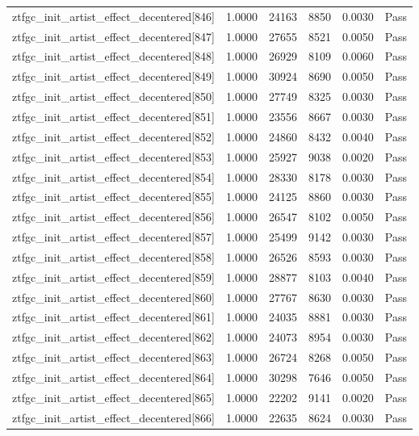 \begin{table}[htbp]
\begin{tabular}{llrrll}
ztfgc\_init\_artist\_effect\_decentered[846] & 1.0000 & 24163 & 8850 & 0.0030 & Pass \\
ztfgc\_init\_artist\_effect\_decentered[847] & 1.0000 & 27655 & 8521 & 0.0050 & Pass \\
ztfgc\_init\_artist\_effect\_decentered[848] & 1.0000 & 26929 & 8109 & 0.0060 & Pass \\
ztfgc\_init\_artist\_effect\_decentered[849] & 1.0000 & 30924 & 8690 & 0.0050 & Pass \\
ztfgc\_init\_artist\_effect\_decentered[850] & 1.0000 & 27749 & 8325 & 0.0030 & Pass \\
ztfgc\_init\_artist\_effect\_decentered[851] & 1.0000 & 23556 & 8667 & 0.0030 & Pass \\
ztfgc\_init\_artist\_effect\_decentered[852] & 1.0000 & 24860 & 8432 & 0.0040 & Pass \\
ztfgc\_init\_artist\_effect\_decentered[853] & 1.0000 & 25927 & 9038 & 0.0020 & Pass \\
ztfgc\_init\_artist\_effect\_decentered[854] & 1.0000 & 28330 & 8178 & 0.0030 & Pass \\
ztfgc\_init\_artist\_effect\_decentered[855] & 1.0000 & 24125 & 8860 & 0.0030 & Pass \\
ztfgc\_init\_artist\_effect\_decentered[856] & 1.0000 & 26547 & 8102 & 0.0050 & Pass \\
ztfgc\_init\_artist\_effect\_decentered[857] & 1.0000 & 25499 & 9142 & 0.0030 & Pass \\
ztfgc\_init\_artist\_effect\_decentered[858] & 1.0000 & 26526 & 8593 & 0.0030 & Pass \\
ztfgc\_init\_artist\_effect\_decentered[859] & 1.0000 & 28877 & 8103 & 0.0040 & Pass \\
ztfgc\_init\_artist\_effect\_decentered[860] & 1.0000 & 27767 & 8630 & 0.0030 & Pass \\
ztfgc\_init\_artist\_effect\_decentered[861] & 1.0000 & 24035 & 8881 & 0.0030 & Pass \\
ztfgc\_init\_artist\_effect\_decentered[862] & 1.0000 & 24073 & 8954 & 0.0030 & Pass \\
ztfgc\_init\_artist\_effect\_decentered[863] & 1.0000 & 26724 & 8268 & 0.0050 & Pass \\
ztfgc\_init\_artist\_effect\_decentered[864] & 1.0000 & 30298 & 7646 & 0.0050 & Pass \\
ztfgc\_init\_artist\_effect\_decentered[865] & 1.0000 & 22202 & 9141 & 0.0020 & Pass \\
ztfgc\_init\_artist\_effect\_decentered[866] & 1.0000 & 22635 & 8624 & 0.0030 & Pass \\

\end{tabular}
\end{table}
